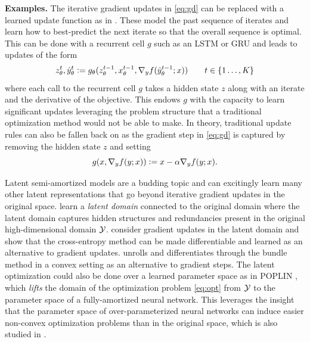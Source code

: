 \documentclass[twoside,11pt]{article}
\begin{document}
\textbf{Examples.}
The iterative gradient updates in \cref{eq:gd}
can be replaced with a learned update function as in
\citet{ravi2016optimization,li2016learning,li2017learning}.
These model the past sequence of iterates and learn how
to best-predict the next iterate so that the overall
sequence is optimal.
This can be done with a recurrent cell $g$ such
as an LSTM \citep{hochreiter1997long} or GRU \citep{cho2014learning}
and leads to updates of the form
\begin{equation}
  z^t_\theta, \hat y^{t}_\theta \vcentcolon= g_\theta(z^{t-1}_\theta, x^{t-1}_\theta, \nabla_y f(\hat y^{t-1}_\theta; x)) \qquad t\in\{1\ldots,K\}
  \label{eq:rec}
\end{equation}
where each call to the recurrent cell $g$
takes a hidden state $z$ along with an iterate and
the derivative of the objective.
This endows $g$ with the capacity to learn significant
updates leveraging the problem structure that a
traditional optimization method would not be able
to make.
In theory, traditional update rules can also be
fallen back on as the gradient step in \cref{eq:gd}
is captured by removing the hidden state $z$ and
setting
\begin{equation}
  g(x, \nabla_y f(y; x))\vcentcolon= x-\alpha\nabla_y f(y; x).
  \label{eq:rec-grad-step}
\end{equation}

Latent semi-amortized models are a budding topic and can
excitingly learn many other latent representations
that go beyond iterative gradient updates in the original
space.
\citet{luo2018neural,amos2019dcem}
learn a \emph{latent domain} connected to the
original domain where the latent domain captures
hidden structures and redundancies present in
the original high-dimensional domain ${\mathcal{Y}}$.
\citet{luo2018neural} consider gradient updates
in the latent domain and \citet{amos2019dcem}
show that the cross-entropy method \citep{de2005tutorial}
can be made differentiable and learned as an alternative
to gradient updates.
\citet{amos2017input} unrolls and differentiates through
the bundle method \citep{smola2007bundle} in a convex setting
as an alternative to gradient steps.
The latent optimization could also be done over a learned parameter
space as in POPLIN \citep{wang2019exploring}, which \emph{lifts}
the domain of the optimization problem \cref{eq:opt}
from ${\mathcal{Y}}$ to the parameter space of a fully-amortized neural network.
This leverages the insight that the parameter space of
over-parameterized neural networks can induce easier
non-convex optimization problems than in the original
space, which is also studied in \citet{hoyer2019neural}.
\end{document}
